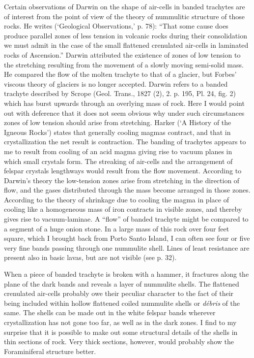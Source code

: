 \documentclass[a4paper, 12pt, oneside]{article}
\begin{document}
Certain observations of Darwin on the shape of air-cells in banded trachytes are of interest from the point of view of the theory of nummulitic structure of those rocks. He writes (`Geological Observations,' p. 78): ``That some cause does produce parallel zones of less tension in volcanic rocks during their consolidation we must admit in the case of the small flattened crenulated air-cells in laminated rocks of Ascension.'' Darwin attributed the existence of zones of low tension to the stretching resulting from the movement of a slowly moving semi-solid mass. He compared the flow of the molten trachyte to that of a glacier, but Forbes' viscous theory of glaciers is no longer accepted. Darwin refers to a banded trachyte described by Scrope (Geol. Trans., 1827 (2), 2. p. 195, Pl. 24, fig. 2) which has burst upwards through an overlying mass of rock. Here I would point out with deference that it does not seem obvious why under such circumstances zones of low tension should arise from stretching. Harker (`A History of the Igneous Rocks') states that generally cooling magmas contract, and that in crystallization the net result is contraction. The banding of trachytes appears to me to result from cooling of an acid magma giving rise to vacuum planes in which small crystals form. The streaking of air-cells and the arrangement of felspar crystals lengthways would result from the flow movement. According to Darwin's theory the low-tension zones arise from stretching in the direction of flow, and the gases distributed through the mass become arranged in those zones. According to the theory of shrinkage due to cooling the magma in place of cooling like a homogeneous mass of iron contracts in visible zones, and thereby gives rise to vacuum-laminae. A ``flow'' of banded trachyte might be compared to a segment of a huge onion stone. In a large mass of this rock over four feet square, which I brought back from Porto Santo Island, I can often see four or five very fine bands passing through one nummulite shell. Lines of least resistance are present also in basic lavas, but are not visible (see p. 32).

When a piece of banded trachyte is broken with a hammer, it fractures along the plane of the dark bands and reveals a layer of nummulite shells. The flattened crenulated air-cells probably owe their peculiar character to the fact of their being included within hollow flattened coiled nummulite shells or \emph{débris} of the same. The shells can be made out in the white felspar bands wherever crystallization has not gone too far, as well as in the dark zones. I find to my surprise that it is possible to make out some structural details of the shells in thin sections of rock. Very thick sections, however, would probably show the Foraminiferal structure better.
\end{document}
